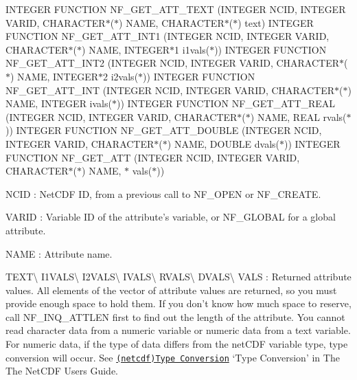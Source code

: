I\+N\+T\+E\+G\+ER F\+U\+N\+C\+T\+I\+ON N\+F\+\_\+\+G\+E\+T\+\_\+\+A\+T\+T\+\_\+\+T\+E\+XT (I\+N\+T\+E\+G\+ER N\+C\+ID, I\+N\+T\+E\+G\+ER V\+A\+R\+ID, C\+H\+A\+R\+A\+C\+T\+E\+R$\ast$($\ast$) N\+A\+ME, C\+H\+A\+R\+A\+C\+T\+E\+R$\ast$($\ast$) text) I\+N\+T\+E\+G\+ER F\+U\+N\+C\+T\+I\+ON N\+F\+\_\+\+G\+E\+T\+\_\+\+A\+T\+T\+\_\+\+I\+N\+T1 (I\+N\+T\+E\+G\+ER N\+C\+ID, I\+N\+T\+E\+G\+ER V\+A\+R\+ID, C\+H\+A\+R\+A\+C\+T\+E\+R$\ast$($\ast$) N\+A\+ME, I\+N\+T\+E\+G\+E\+R$\ast$1 i1vals($\ast$)) I\+N\+T\+E\+G\+ER F\+U\+N\+C\+T\+I\+ON N\+F\+\_\+\+G\+E\+T\+\_\+\+A\+T\+T\+\_\+\+I\+N\+T2 (I\+N\+T\+E\+G\+ER N\+C\+ID, I\+N\+T\+E\+G\+ER V\+A\+R\+ID, C\+H\+A\+R\+A\+C\+T\+E\+R$\ast$($\ast$) N\+A\+ME, I\+N\+T\+E\+G\+E\+R$\ast$2 i2vals($\ast$)) I\+N\+T\+E\+G\+ER F\+U\+N\+C\+T\+I\+ON N\+F\+\_\+\+G\+E\+T\+\_\+\+A\+T\+T\+\_\+\+I\+NT (I\+N\+T\+E\+G\+ER N\+C\+ID, I\+N\+T\+E\+G\+ER V\+A\+R\+ID, C\+H\+A\+R\+A\+C\+T\+E\+R$\ast$($\ast$) N\+A\+ME, I\+N\+T\+E\+G\+ER ivals($\ast$)) I\+N\+T\+E\+G\+ER F\+U\+N\+C\+T\+I\+ON N\+F\+\_\+\+G\+E\+T\+\_\+\+A\+T\+T\+\_\+\+R\+E\+AL (I\+N\+T\+E\+G\+ER N\+C\+ID, I\+N\+T\+E\+G\+ER V\+A\+R\+ID, C\+H\+A\+R\+A\+C\+T\+E\+R$\ast$($\ast$) N\+A\+ME, R\+E\+AL rvals($\ast$)) I\+N\+T\+E\+G\+ER F\+U\+N\+C\+T\+I\+ON N\+F\+\_\+\+G\+E\+T\+\_\+\+A\+T\+T\+\_\+\+D\+O\+U\+B\+LE (I\+N\+T\+E\+G\+ER N\+C\+ID, I\+N\+T\+E\+G\+ER V\+A\+R\+ID, C\+H\+A\+R\+A\+C\+T\+E\+R$\ast$($\ast$) N\+A\+ME, D\+O\+U\+B\+LE dvals($\ast$)) I\+N\+T\+E\+G\+ER F\+U\+N\+C\+T\+I\+ON N\+F\+\_\+\+G\+E\+T\+\_\+\+A\+TT (I\+N\+T\+E\+G\+ER N\+C\+ID, I\+N\+T\+E\+G\+ER V\+A\+R\+ID, C\+H\+A\+R\+A\+C\+T\+E\+R$\ast$($\ast$) N\+A\+ME, $\ast$ vals($\ast$))

{\ttfamily N\+C\+ID} \+: Net\+C\+DF ID, from a previous call to N\+F\+\_\+\+O\+P\+EN or N\+F\+\_\+\+C\+R\+E\+A\+TE.

{\ttfamily V\+A\+R\+ID} \+: Variable ID of the attribute’s variable, or N\+F\+\_\+\+G\+L\+O\+B\+AL for a global attribute.

{\ttfamily N\+A\+ME} \+: Attribute name.

{\ttfamily T\+E\+XT}\textbackslash{} {\ttfamily I1\+V\+A\+LS}\textbackslash{} {\ttfamily I2\+V\+A\+LS}\textbackslash{} {\ttfamily I\+V\+A\+LS}\textbackslash{} {\ttfamily R\+V\+A\+LS}\textbackslash{} {\ttfamily D\+V\+A\+LS}\textbackslash{} {\ttfamily V\+A\+LS} \+: Returned attribute values. All elements of the vector of attribute values are returned, so you must provide enough space to hold them. If you don’t know how much space to reserve, call N\+F\+\_\+\+I\+N\+Q\+\_\+\+A\+T\+T\+L\+EN first to find out the length of the attribute. You cannot read character data from a numeric variable or numeric data from a text variable. For numeric data, if the type of data differs from the net\+C\+DF variable type, type conversion will occur. See \href{netcdf.html#Type-Conversion}{\tt (netcdf)Type Conversion} ‘\+Type Conversion’ in The The Net\+C\+DF Users Guide.

